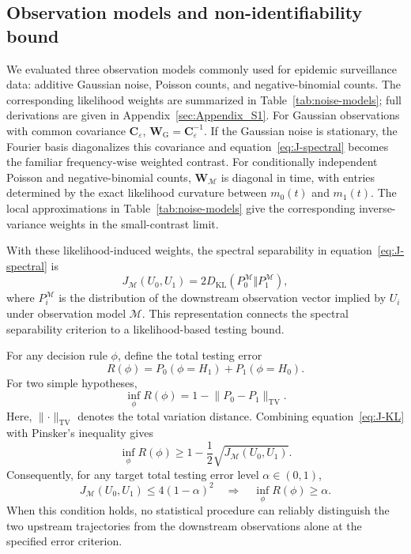 \subsection*{Observation models and non-identifiability bound}

We evaluated three observation models commonly used for epidemic surveillance data: additive Gaussian noise, Poisson counts, and negative-binomial counts. The corresponding likelihood weights are summarized in Table~\ref{tab:noise-models}; full derivations are given in Appendix~\ref{sec:Appendix_S1}. For Gaussian observations with common covariance \(\mathbf C_\varepsilon\), \(\mathbf W_{\mathrm G}=\mathbf C_\varepsilon^{-1}\). If the Gaussian noise is stationary, the Fourier basis diagonalizes this covariance and equation~\eqref{eq:J-spectral} becomes the familiar frequency-wise weighted contrast. For conditionally independent Poisson and negative-binomial counts, \(\mathbf W_{\mathcal M}\) is diagonal in time, with entries determined by the exact likelihood curvature between \(m_0(t)\) and \(m_1(t)\). The local approximations in Table~\ref{tab:noise-models} give the corresponding inverse-variance weights in the small-contrast limit.

With these likelihood-induced weights, the spectral separability in equation~\eqref{eq:J-spectral} is
\begin{equation}
J_{\mathcal M}(U_0,U_1)
=
2D_{\mathrm{KL}}
\left(
P_0^{\mathcal M}\Vert P_1^{\mathcal M}
\right),
\label{eq:J-KL}
\end{equation}
where \(P_i^{\mathcal M}\) is the distribution of the downstream observation vector implied by \(U_i\) under observation model \(\mathcal M\). This representation connects the spectral separability criterion to a likelihood-based testing bound.

For any decision rule \(\phi\), define the total testing error
\[
R(\phi) = P_0(\phi=H_1)+P_1(\phi=H_0).
\]
For two simple hypotheses,
\[
\inf_\phi R(\phi)=1-\lVert P_0-P_1\rVert_{\mathrm{TV}}.
\]
Here, \(\lVert \cdot\rVert_{\mathrm{TV}}\) denotes the total variation distance. Combining equation~\eqref{eq:J-KL} with Pinsker's inequality gives
\begin{equation}
\inf_\phi R(\phi)
\ge
1-\frac12\sqrt{J_{\mathcal M}(U_0,U_1)}.
\label{eq:testing-bound}
\end{equation}
Consequently, for any target total testing error level \(\alpha\in(0,1)\),
\begin{equation}
J_{\mathcal M}(U_0,U_1)
\le
4(1-\alpha)^2
\quad\Longrightarrow\quad
\inf_\phi R(\phi)\ge \alpha .
\label{eq:nonidentifiability-threshold}
\end{equation}
When this condition holds, no statistical procedure can reliably distinguish the two upstream trajectories from the downstream observations alone at the specified error criterion.

